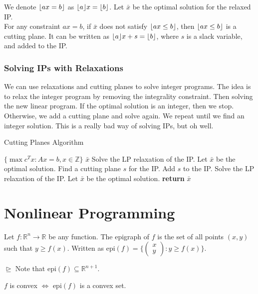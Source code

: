 \documentclass[a4paper]{report}
\newcommand{\m}[1]{\begin{pmatrix}
	#1
\end{pmatrix}}
\DeclarePairedDelimiter{\floor}{\lfloor}{\rfloor}
\begin{document}
	\begin{definition}
		We denote $\floor{ax = b}$ as $\floor{a}x = \floor{b}$. Let $\bar x$ be the
		optimal solution for the relaxed IP. \\ For any constraint $ax = b$, if
		$\bar x$ does not satisfy $\floor{ax \leq b}$, then $\floor{ax \leq b}$ is a
		cutting plane. It can be written as $\floor{a}x + s = \floor{b}$, where $s$ is
		a slack variable, and added to the IP.
	\end{definition}

	\subsection{Solving IPs with Relaxations}
	We can use relaxations and cutting planes to solve integer programs. The idea
	is to relax the integer program by removing the integrality constraint. Then solving
	the new linear program. If the optimal solution is an integer, then we stop.
	Otherwise, we add a cutting plane and solve again. We repeat until we find an
	integer solution. This is a really bad way of solving IPs, but oh well.

	\begin{algorithm}
		 \algrenewcommand{}
		\algrenewcommand{}
		\caption{Cutting Planes Algorithm}
		\label{alg:cut}
		\begin{algorithmic}
			[1] \Require $\{\max c^{T}x : Ax = b, x \in \mathbb{Z}\}$ \Ensure $\bar x$
			\State Solve the LP relaxation of the IP. Let $\bar x$ be the optimal
			solution.  \State Find a cutting plane $s$
			for the IP. \State Add $s$ to the IP. \State Solve the LP relaxation of
			the IP. Let $\bar x$ be the optimal solution. \EndWhile \State \textbf{return}
			$\bar x$
		\end{algorithmic}
	\end{algorithm}

	\chapter{Nonlinear Programming}

    \begin{definition}[Epigraphs]
        Let $f : \mathbb{R}^{n} \rightarrow \mathbb{R}$ be any function. The
        epigraph of $f$ is the set of all points $(x, y)$ such that $y \geq f(x)$.
        Written as $\text{epi}(f) = \Bigg\{\m{x \\ y} : y \geq f(x)\Bigg\}$. 
        
        $\trianglerighteq$ Note that $\text{epi}(f) \subseteq \mathbb{R}^{n+1}$.
        \begin{corollary}
            $f$ is convex $\iff$ $\text{epi}(f)$ is a convex set.
        \end{corollary}
    \end{definition}
\end{document}

